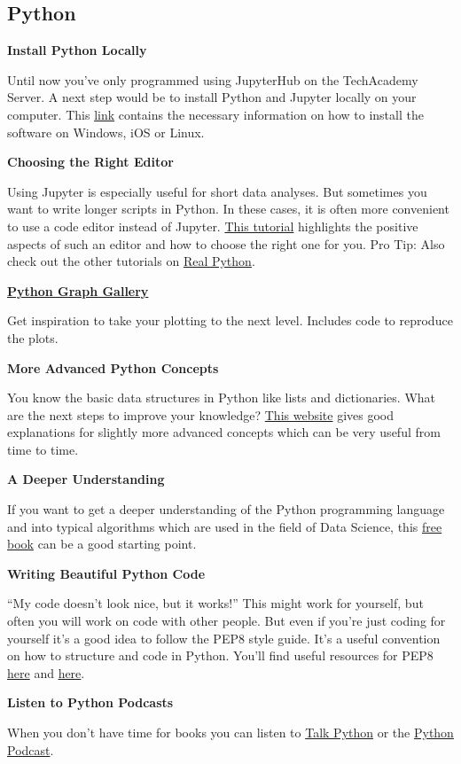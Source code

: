 \documentclass[
  11pt,
]{article}
\newenvironment{tipsp}[1]
  {
  \begin{itemize}
  \footnotesize
  \renewcommand{\labelitemi}{
    \raisebox{-.7\height}[0pt][0pt]{
      {\setkeys{Gin}{width=3em,keepaspectratio}
        \texttt{[image: images/\#1.png]}}
    }
  }
  \setlength{\fboxsep}{1em}
  \begin{pbox}
  \item
  }
  {
  \end{pbox}
  \end{itemize}
  }
\begin{document}
\hypertarget{python}{%
\subsection{Python}\label{python}}

\begin{tipsp}p

\textbf{Install Python Locally}

Until now you've only programmed using JupyterHub on the TechAcademy Server. A next step would be to install Python and Jupyter locally on your computer. This \href{https://docs.anaconda.com/anaconda/install/}{link} contains the necessary information on how to install the software on Windows, iOS or Linux.

\textbf{Choosing the Right Editor}

Using Jupyter is especially useful for short data analyses. But sometimes you want to write longer scripts in Python. In these cases, it is often more convenient to use a code editor instead of Jupyter. \href{https://realpython.com/learning-paths/perfect-your-python-development-setup/}{This tutorial} highlights the positive aspects of such an editor and how to choose the right one for you. Pro Tip: Also check out the other tutorials on \href{https://realpython.com/}{Real Python}.

\textbf{\href{https://python-graph-gallery.com/}{Python Graph Gallery}}

Get inspiration to take your plotting to the next level. Includes code to reproduce the plots.

\textbf{More Advanced Python Concepts}

You know the basic data structures in Python like lists and dictionaries. What are the next steps to improve your knowledge? \href{https://book.pythontips.com/en/latest/index.html}{This website} gives good explanations for slightly more advanced concepts which can be very useful from time to time.

\textbf{A Deeper Understanding}

If you want to get a deeper understanding of the Python programming language and into typical algorithms which are used in the field of Data Science, this \href{https://github.com/ab-anand/py-books/blob/master/Data\%20Science\%20from\%20Scratch-\%20First\%20Principles\%20with\%20Python.pdf}{free book} can be a good starting point.

\textbf{Writing Beautiful Python Code}

``My code doesn't look nice, but it works!''
This might work for yourself, but often you will work on code with other people. But even if you're just coding for yourself it's a good idea to follow the PEP8 style guide. It's a useful convention on how to structure and code in Python. You'll find useful resources for PEP8 \href{https://realpython.com/python-pep8/}{here} and \href{https://www.python.org/dev/peps/pep-0020/\#id2}{here}.

\textbf{Listen to Python Podcasts}

When you don't have time for books you can listen to \href{https://talkpython.fm/home}{Talk Python} or the \href{https://www.pythonpodcast.com}{Python Podcast}.

\end{tipsp}

  
\end{document}
